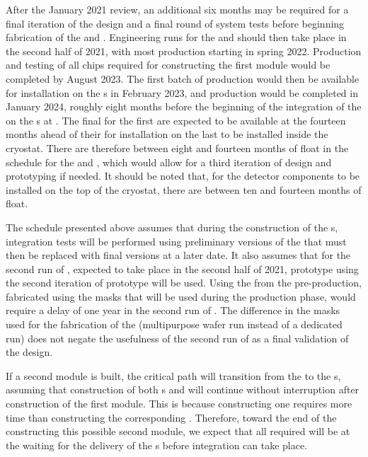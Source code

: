 After the January 2021 review, an additional six months may be 
required for a final iteration of the  design
and a final round of system tests before beginning fabrication
of the  and . Engineering runs
for the  and  should then take place in the
second half of 2021, with most production starting in
spring 2022. Production and testing of all chips required
for constructing the first    module
would be completed by August 2023. The first batch of
production  would then be available for installation on
the s in February 2023, and production would be
completed in January 2024, roughly eight months before the 
beginning of the integration of the  on the
s at . The final  for the 
first  are expected to be available at the  
fourteen months ahead of their for installation on the 
last  to be installed inside the cryostat.
There are therefore between eight and fourteen months of float
in the schedule for the  and , which 
would allow for a third iteration of design and prototyping
if needed. It should be noted that, for the detector components
to be installed on the top of the cryostat, there are between
ten and fourteen months of float.

The schedule presented above assumes that during the
construction of the s,
integration tests will be performed using preliminary
versions of the  that must then be replaced
with final versions at a later date. It also assumes that for the
second run of , expected to take place in the
second half of 2021, prototype  using the
second iteration of prototype  will be used.
Using the  from the pre-production, fabricated using
the masks that will be used during the production phase, 
would require a delay of one year in the second run of
. The difference in the masks used for the
fabrication of the  (multipurpose wafer run instead 
of a dedicated run) does not negate the usefulness of
the second run of  as a final validation of
the   design.

If a second    module is built, the critical
path will transition from the 
to the s, assuming that construction
of both s and  will continue 
without interruption after construction of the first module. 
This is because constructing one  requires 
more time than constructing the corresponding . Therefore,
toward the end of the constructing this possible second module,
we expect that all required  will be at the
 waiting for the delivery of the s before
integration can take place.

